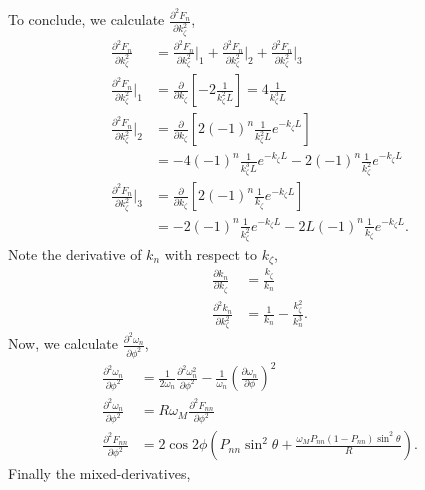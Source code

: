 \documentclass{article}
\begin{document}
To conclude, we calculate $\frac{\partial^2 F_{n}}{\partial k_{\zeta}^2}$,
\begin{align}
\frac{\partial^2 F_{n}}{\partial k_{\zeta}^2} &= \frac{\partial^2 F_{n}}{\partial k_{\zeta}^2}\bigg|_{1} + \frac{\partial^2 F_{n}}{\partial k_{\zeta}^2}\bigg|_{2} + \frac{\partial^2 F_{n}}{\partial k_{\zeta}^2}\bigg|_{3} \\
\frac{\partial^2 F_{n}}{\partial k_{\zeta}^2}\bigg|_{1} &= \frac{\partial}{\partial k_{\zeta}} \left[-2 \frac{1}{k_{\zeta}^2L} \right]= 4 \frac{1}{k_{\zeta}^3 L} \\
\frac{\partial^2 F_{n}}{\partial k_{\zeta}^2}\bigg|_{2} &= \frac{\partial}{\partial k_{\zeta}} \left[ 2 (-1)^n \frac{1}{k_{\zeta}^2 L} e^{-k_{\zeta} L } \right] \\
&= -4 (-1)^n \frac{1}{k_{\zeta}^3 L} e^{-k_{\zeta} L} - 2 (-1)^n \frac{1}{k_{\zeta}^2} e^{- k_{\zeta} L} \\
\frac{\partial^2 F_{n}}{\partial k_{\zeta}^2}\bigg|_{3} &= \frac{\partial}{\partial k_{\zeta}} \left[ 2 (-1)^n \frac{1}{k_{\zeta}} e^{- k_{\zeta} L } \right] \\
&= -2 (-1)^n \frac{1}{k_{\zeta}^2} e^{- k_{\zeta} L } - 2L (-1)^n \frac{1}{k_{\zeta}} e^{- k_{\zeta} L}.
\end{align}
Note the derivative of $k_{n}$ with respect to $k_{\zeta}$,
\begin{align}
\frac{\partial k_{n}}{\partial k_{\zeta}} &= \frac{k_{\zeta}}{k_{n}} \\
\frac{\partial^2 k_{n}}{\partial k_{\zeta}^2} &= \frac{1}{k_{n}} - \frac{k_{\zeta}^2}{k_{n}^3}.
\end{align}
Now, we calculate $\frac{\partial^2 \omega_{n}}{\partial \phi^2}$,
\begin{align}
\frac{\partial^2 \omega_{n}}{\partial \phi^2} &= \frac{1}{2 \omega_{n}} \frac{\partial^2 \omega_{n}^2}{\partial \phi^2} - \frac{1}{\omega_{n}} \left(\frac{\partial \omega_{n}}{\partial \phi}\right)^2 \\
\frac{\partial^2 \omega_{n}}{\partial \phi^2} &= R \omega_{M} \frac{\partial^2 F_{nn}}{\partial \phi^2} \\
\frac{\partial^2 F_{nn}}{\partial \phi^2} &= 2 \cos{2\phi} \left( P_{nn} \sin^2{\theta} + \frac{\omega_{M} P_{nn} (1-P_{nn}) \sin^2{\theta}}{R} \right).
\end{align}
Finally the mixed-derivatives,
\end{document}
